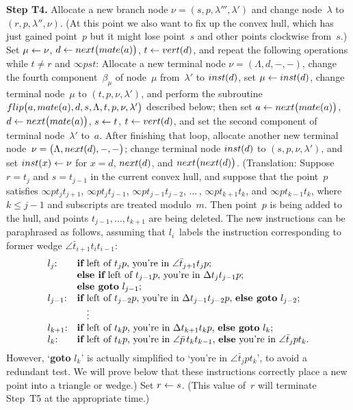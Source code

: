 \smallskip
{\bf Step T4.}\quad
Allocate a new branch node $\nu=(s,p,\lambda''',\lambda')$ and change
node~$\lambda$ to $(r,p,\lambda'',\nu)$. (At this point we also want
to fix up the convex hull, which has just gained point~$p$ but it might
lose point~$s$ and other points clockwise from~$s$.) Set $\mu\leftarrow\nu$,
$d\leftarrow{\sl next\/}\bigl({\sl mate\/}(a)\bigr)$, $t\leftarrow{\sl vert\/}(d)$,
and repeat the following operations while $t\neq r$ and $\infty pst$:
Allocate a new terminal node $\nu=(\Lambda,d,-,-)$, change the fourth
component~$\beta_{\mu}$ of node~$\mu$ from~$\lambda'$ to ${\sl
inst\/}(d)$, set $\mu\leftarrow{\sl inst\/}(d)$, change terminal node~$\mu$
to $(t,p,\nu,\lambda')$, and perform the subroutine ${\sl
flip\/}\bigl(a,{\sl mate\/}(a),d,s,\Lambda,t,p,\nu,\lambda'\bigr)$
described below; then set $a\leftarrow{\sl next\/}\bigr({\sl
mate\/}(a)\bigr)$, $d\leftarrow{\sl next\/}\bigl({\sl mate\/}(a)\bigr)$,
$s\leftarrow t$, $t\leftarrow{\sl vert\/}(d)$, and set the second component of
terminal node~$\lambda'$ to~$a$. After finishing that loop, allocate
another new terminal node~$\nu=\bigl(\Lambda,{\sl
next\/}(d),-,-\bigr)$;  change terminal node ${\sl inst\/}(d)$ to
$(s,p,\nu,\lambda')$, and set ${\sl inst\/}(x)\leftarrow\nu$ for $x=d$, ${\sl
next\/}(d)$, and ${\sl next\/}\bigl({\sl next\/}(d)\bigr)$.
(Translation: Suppose $r=t_j$ and $s=t_{j-1}$ in the current convex
hull, and suppose that the point~$p$ satisfies $\infty pt_jt_{j+1}$,
$\infty pt_jt_{j-1}$, $\infty pt_{j-1}t_{j-2}$, $\ldots\,$, $\infty
pt_{k+1}t_k$, and $\infty pt_{k-1}t_k$, where $k\leq j-1$ and
subscripts are treated modulo~$m$. Then point~$p$ is being added to
the hull, and points $t_{j-1},\ldots,t_{k+1}$ are being deleted. The
new instructions can be paraphrased as follows, assuming that $l_i$~labels
 the instruction corresponding to former wedge
$\angle\bar{t}_{i+1}t_it_{i-1}$: 
$$\vcenter{\halign{#\hfil\quad&#\hfil\cr
$l_j$:&{\bf if} left of $t_jp$, you're in $\angle\bar{t}_{j+1}t_jp$;\cr
&{\bf else if} left of $t_{j-1}p$, you're in $\Delta t_jt_{j-1}p$;\cr
&{\bf else goto} $l_{j-1}$;\cr
$l_{j-1}$:&{\bf if} left of $t_{j-2}p$, you're in $\Delta
t_{j-1}t_{j-2}p$, {\bf else goto} $l_{j-2}$;\cr
&\quad$\vdots$\cr
$l_{k+1}$:&{\bf if} left of $t_kp$, you're in $\Delta t_{k+1}t_kp$,
{\bf else goto} $l_k$;\cr
$l_k$:&{\bf if} left of $t_kp$, you're in $\angle\bar{p}\,t_kt_{k-1}$,
{\bf else} you're in $\angle\bar{t}_jpt_k$.\cr}}$$
However, `{\bf goto} $l_k$' is actually simplified to `you're in
$\angle\bar{t}_jpt_k$', to avoid a redundant test. We will prove below
that these instructions correctly place a new point into a triangle or
wedge.)
Set $r\leftarrow s$. (This value of~$r$ will terminate Step~T5 at the
appropriate time.)

